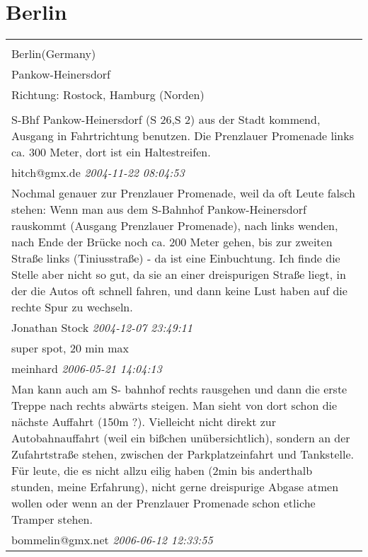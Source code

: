 \documentclass[a4paper,12pt]{article}
\begin{document}
\section{Berlin}
\begin{tabular}{|p{13cm}|}
\hline\\
Berlin(Germany)\\
Pankow-Heinersdorf\\
Richtung: Rostock, Hamburg (Norden) \\
\hline\\
S-Bhf Pankow-Heinersdorf (S 26,S 2) aus der Stadt kommend, Ausgang in Fahrtrichtung benutzen. Die Prenzlauer Promenade links ca. 300 Meter, dort ist ein Haltestreifen. \\
hitch@gmx.de \textit{ 2004-11-22 08:04:53 }\\\hline Nochmal genauer zur Prenzlauer Promenade, weil da oft Leute falsch stehen: Wenn man aus dem S-Bahnhof Pankow-Heinersdorf rauskommt (Ausgang Prenzlauer Promenade), nach links wenden, nach Ende der Brücke noch ca. 200 Meter gehen, bis zur zweiten Straße links (Tiniusstraße) - da ist eine Einbuchtung. Ich finde die Stelle aber nicht so gut, da sie an einer dreispurigen Straße liegt, in der die Autos oft schnell fahren, und dann keine Lust haben auf die rechte Spur zu wechseln. \\
Jonathan Stock \textit{ 2004-12-07 23:49:11 }\\\hline super spot, 20 min max \\
meinhard \textit{ 2006-05-21 14:04:13 }\\\hline Man kann auch am S- bahnhof rechts rausgehen und dann die erste Treppe nach rechts abwärts steigen. Man sieht von dort schon die nächste Auffahrt (150m ?). Vielleicht nicht direkt zur Autobahnauffahrt (weil ein bißchen unübersichtlich), sondern an der Zufahrtstraße stehen, zwischen der Parkplatzeinfahrt und Tankstelle. Für leute, die es nicht allzu eilig haben (2min bis anderthalb stunden, meine Erfahrung), nicht gerne dreispurige Abgase atmen wollen oder wenn an der Prenzlauer Promenade schon etliche Tramper stehen. \\
bommelin@gmx.net \textit{ 2006-06-12 12:33:55 }\\\hline
\end{tabular}
\end{document}
